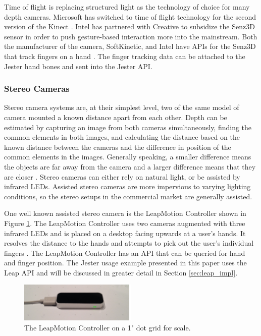 Time of flight is replacing structured light as the technology of choice for many depth cameras. Microsoft has switched to time of flight technology for the second version of the Kinect \cite{kinect2}. Intel has partnered with Creative to subsidize the Senz3D sensor in order to push gesture-based interaction more into the mainstream. Both the manufacturer of the camera, SoftKinetic, and Intel have APIs for the Senz3D that track fingers on a hand \cite{senz3d}. The finger tracking data can be attached to the Jester hand bones and sent into the Jester API.

\subsubsection{Stereo Cameras}

Stereo camera systems are, at their simplest level, two of the same model of camera mounted a known distance apart from each other. Depth can be estimated by capturing an image from both cameras simultaneously, finding the common elements in both images, and calculating the distance based on the known distance between the cameras and the difference in position of the common elements in the images. Generally speaking, a smaller difference means the objects are far away from the camera and a larger difference means that they are closer \cite{lucas1981iterative}. Stereo cameras can either rely on natural light, or be assisted by infrared LEDs. Assisted stereo cameras are more impervious to varying lighting conditions, so the stereo setups in the commercial market are generally assisted.

One well known assisted stereo camera is the LeapMotion Controller shown in Figure \ref{fig:leap}. The LeapMotion Controller uses two cameras augmented with three infrared LEDs and is placed on a desktop facing upwards at a user's hands. It resolves the distance to the hands and attempts to pick out the user's individual fingers \cite{weichert2013analysis}. The LeapMotion Controller has an API that can be queried for hand and finger position. The Jester usage example presented in this paper uses the Leap API and will be discussed in greater detail in Section \ref{sec:leap_impl}.

\begin{figure}[]
\centering
\includegraphics[width=0.5\textwidth]{figures/leap}
\caption{The LeapMotion Controller on a 1" dot grid for scale.}
\label{fig:leap}
\end{figure}

